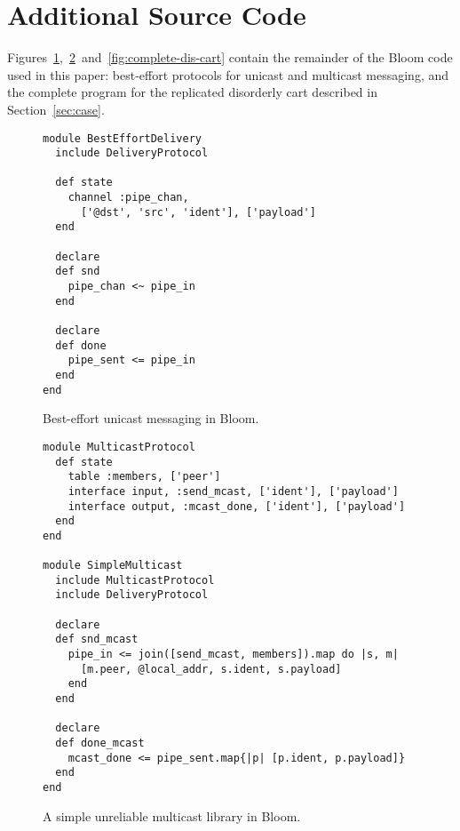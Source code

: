 \section{Additional Source Code}
Figures~\ref{fig:delivery-impl},~\ref{fig:multicast-impl}~and~\ref{fig:complete-dis-cart}
contain the remainder of the Bloom code used in this paper: best-effort
protocols for unicast and multicast messaging, and the complete program for the
replicated disorderly cart described in Section~\ref{sec:case}.

\label{app:network-code}

\begin{figure}[h!]
\begin{scriptsize}
\begin{lstlisting}
module BestEffortDelivery
  include DeliveryProtocol

  def state
    channel :pipe_chan,
      ['@dst', 'src', 'ident'], ['payload']
  end

  declare
  def snd
    pipe_chan <~ pipe_in
  end

  declare
  def done
    pipe_sent <= pipe_in
  end
end
\end{lstlisting}
\centering
\vspace{-10pt}
\caption{Best-effort unicast messaging in Bloom.}
\label{fig:delivery-impl}
\end{scriptsize}
\vspace{-2pt}
\end{figure}


\begin{figure}[h!]
\begin{scriptsize}
\begin{lstlisting}
module MulticastProtocol
  def state
    table :members, ['peer']
    interface input, :send_mcast, ['ident'], ['payload']
    interface output, :mcast_done, ['ident'], ['payload']
  end
end

module SimpleMulticast
  include MulticastProtocol
  include DeliveryProtocol

  declare
  def snd_mcast
    pipe_in <= join([send_mcast, members]).map do |s, m|
      [m.peer, @local_addr, s.ident, s.payload]
    end
  end

  declare
  def done_mcast
    mcast_done <= pipe_sent.map{|p| [p.ident, p.payload]}
  end
end
\end{lstlisting}
\centering
\vspace{-10pt}
\caption{A simple unreliable multicast library in Bloom.}
\label{fig:multicast-impl}
\end{scriptsize}
\vspace{-2pt}
\end{figure}

